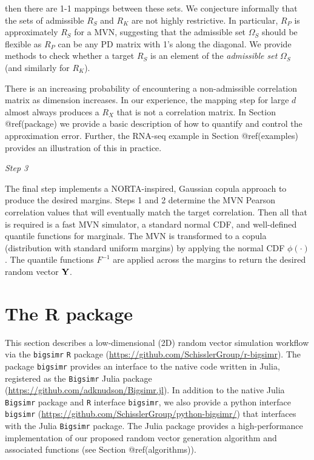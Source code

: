 \documentclass[
]{jss}
\begin{document}
then there are 1-1 mappings between these sets. We conjecture informally
that the sets of admissible \(R_S\) and \(R_K\) are not highly
restrictive. In particular, \(R_P\) is approximately \(R_S\) for a MVN,
suggesting that the admissible set \(\Omega_S\) should be flexible as
\(R_P\) can be any PD matrix with 1's along the diagonal. We provide
methods to check whether a target \(R_S\) is an element of the
\emph{admissible set} \(\Omega_S\) (and similarly for \(R_K\)).

There is an increasing probability of encountering a non-admissible
correlation matrix as dimension increases. In our experience, the
mapping step for large \(d\) almost always produces a \(R_X\) that is
not a correlation matrix. In Section @ref(package) we provide a basic
description of how to quantify and control the approximation error.
Further, the RNA-seq example in Section @ref(examples) provides an
illustration of this in practice.

\emph{Step 3}

The final step implements a NORTA-inspired, Gaussian copula approach to
produce the desired margins. Steps 1 and 2 determine the MVN Pearson
correlation values that will eventually match the target correlation.
Then all that is required is a fast MVN simulator, a standard normal
CDF, and well-defined quantile functions for marginals. The MVN is
transformed to a copula (distribution with standard uniform margins) by
applying the normal CDF \(\phi(\cdot)\). The quantile functions
\(F^{-1}\) are applied across the margins to return the desired random
vector \({\bf Y}\).

\section[bigsimr-pkg]{The  R package}\label{package}

This section describes a low-dimensional (2D) random vector simulation
workflow via the \texttt{bigsimr} \texttt{R} package
(\url{https://github.com/SchisslerGroup/r-bigsimr}). The package
\texttt{bigsimr} provides an interface to the native code written in
Julia, registered as the \texttt{Bigsimr} Julia package
(\url{https://github.com/adknudson/Bigsimr.jl}). In addition to the
native Julia \texttt{Bigsimr} package and \texttt{R} interface
\texttt{bigsimr}, we also provide a python interface \texttt{bigsimr}
(\url{https://github.com/SchisslerGroup/python-bigsimr/}) that
interfaces with the Julia \texttt{Bigsimr} package. The Julia package
provides a high-performance implementation of our proposed random vector
generation algorithm and associated functions (see Section
@ref(algorithms)).
\end{document}

